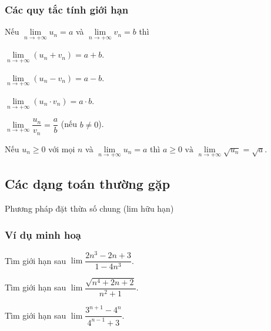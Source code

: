 \begin{tomtat}
\subsubsection{Các quy tắc tính giới hạn}
\begin{tc} 
	\begin{enumEX}[a)]{1}
		\item Nếu $\lim \limits_{n \rightarrow+\infty} u_{n}=a$ và $\lim \limits_{n \rightarrow+\infty} v_{n}=b$ thì 
		\begin{enumEX}[-)]{2}
			\item 	$\lim \limits_{n \rightarrow+\infty}\left(u_{n}+v_{n}\right)=a+b$.
			\item   $\lim \limits_{n \rightarrow+\infty}\left(u_{n}-v_{n}\right)=a-b$. 
			\item $\lim \limits_{n \rightarrow+\infty}\left(u_{n} \cdot v_{n}\right)=a \cdot b$.
			\item $\lim \limits_{n \rightarrow+\infty} \dfrac{u_{n}}{v_{n}}=\dfrac{a}{b}$ (nếu $b \neq 0$).
		\end{enumEX}
		\item Nếu $u_{n} \geq 0$ với mọi $n$ và $\lim \limits_{n \rightarrow+\infty} u_{n}=a$ thì $
		a \geq 0 \text { và } \lim \limits_{n \rightarrow+\infty} \sqrt{u_{n}}=\sqrt{a}$.
	\end{enumEX}
	
\end{tc}
\end{tomtat}
\subsection{Các dạng toán thường gặp}
\begin{dang}{Phương pháp đặt thừa số chung (lim hữu hạn)}
	
\end{dang}
\subsubsection{Ví dụ minh hoạ}
\begin{vd}%
	Tìm giới hạn sau $\lim\dfrac{2n^3-2n+3}{1-4n^3}$.
	\loigiai{
		\[\lim\dfrac{2n^3-2n+3}{1-4n^3}=\lim\dfrac{2-\dfrac{2}{n^2}+\dfrac{3}{n^3}}{\dfrac{1}{n^3}-4}=-\dfrac{1}{2}.\]}
\end{vd}
\begin{vd}%
	Tìm giới hạn sau $\lim\dfrac{\sqrt{n^4+2n+2}}{n^2+1}$.
	\loigiai{
		\[\lim\dfrac{\sqrt{n^4+2n+2}}{n^2+1} = \lim\dfrac{\sqrt{1+\dfrac{2}{n^3}+\dfrac{2}{n^4}}}{1+\dfrac{1}{n^2}}=1.\]}
\end{vd}
\begin{vd}%
	Tìm giới hạn sau $\lim\dfrac{3^{n+1}-4^n}{4^{n-1}+3}$.
	\loigiai{
		\[\lim\dfrac{3^{n+1}-4^n}{4^{n-1}+3} = \lim\dfrac{9\cdot 3^{n-1}-4\cdot 4^{n-1}}{4^{n-1}+3}=\lim\dfrac{9\cdot\left(\dfrac{3}{4}\right)^{n-1}-4}{1+3\cdot\left(\dfrac{1}{4}\right)^{n-1}}=-4.\]}
\end{vd}

